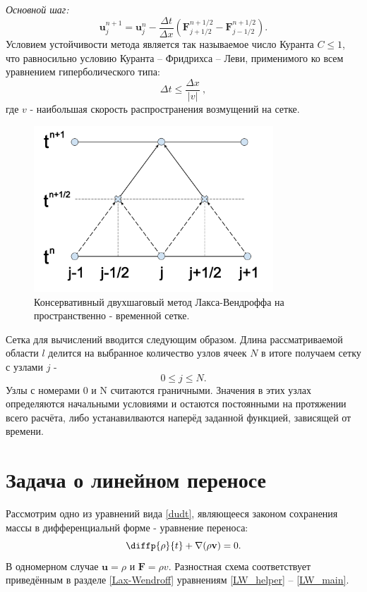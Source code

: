 \documentclass[a4paper]{article}
\begin{document}
	\textit{Основной шаг:}
	\begin{equation}\label{LW_main}
	\mathbf{u}_{j}^{n+1} = \mathbf{u}_{j}^{n} - \frac{\Delta t}{\Delta x} \left(
	\mathbf{F}_{j+1/2}^{n+1/2} - \mathbf{F}_{j-1/2}^{n+1/2}				 \right) .
	\end{equation}
	Условием устойчивости метода является так называемое число Куранта $C \leqslant 1$, что равносильно условию Куранта -- Фридрихса -- Леви, применимого ко всем уравнением гиперболического типа: %
	\begin{equation}
	\Delta t \leqslant \dfrac{\Delta x}{|v|} \:,
	\end{equation}
	где $v$ - наибольшая скорость распространения возмущений на сетке.
	\begin{figure}
		\centering
		\includegraphics[width=0.8\textwidth]{Lax-Wendroff.pdf}
		\caption{Консервативный двухшаговый метод Лакса-Вендроффа на пространственно - временной сетке.}
		\label{LW_picture}
	\end{figure}
	Сетка для вычислений вводится следующим образом. Длина рассматриваемой области $l$ делится на выбранное количество узлов ячеек $N$ в итоге получаем сетку с узлами $j$ - 
	\[
		0 \leqslant j \leqslant N .
	\]
	Узлы с номерами 0 и N считаются граничными. Значения в этих узлах определяются начальными условиями и остаются постоянными на протяжении всего расчёта, либо устанавилваются наперёд заданной функцией, зависящей от времени.
	
	\section{Задача о линейном переносе}\label{transfer}
	Рассмотрим одно из уравнений вида \eqref{dudt}, являющееся законом сохранения массы в дифференциальнй форме - уравнение переноса:
	\begin{equation}
		\diffp{\rho}{t} + \nabla ( \rho \mathbf{v} ) = 0 .
	\end{equation}
	В одномерном случае $\mathbf{u} = \rho$ и $\mathbf{F} = \rho v$. Разностная схема соответствует приведённым в разделе \ref{Lax-Wendroff} уравнениям \eqref{LW_helper} -- \eqref{LW_main}.
	
\end{document}
